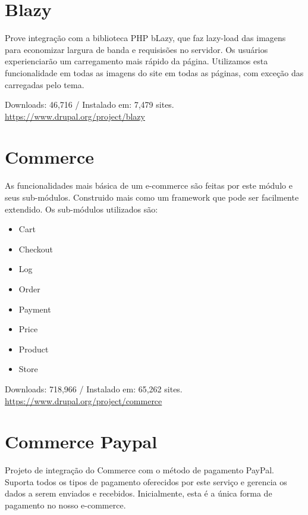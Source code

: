 \section{Blazy}
Prove integração com a biblioteca PHP bLazy, que faz lazy-load das imagens para economizar largura de banda e requisisões no servidor. Os usuários experienciarão um carregamento mais rápido da página. Utilizamos esta funcionalidade em todas as imagens do site em todas as páginas, com exceção das carregadas pelo tema.

\begin{center}
  Downloads: 46,716 / Instalado em: 7,479 sites.
  \url{https://www.drupal.org/project/blazy}
\end{center}

\section{Commerce}
As funcionalidades mais básica de um e-commerce são feitas por este módulo e seus sub-módulos. Construido mais como um framework que pode ser facilmente extendido. Os sub-módulos utilizados são:

\begin{itemize}
  \item Cart
  \item Checkout
  \item Log
  \item Order
  \item Payment
  \item Price
  \item Product
  \item Store
\end{itemize}

\begin{center}
  Downloads: 718,966 / Instalado em: 65,262 sites.
  \url{https://www.drupal.org/project/commerce}
\end{center}

\section{Commerce Paypal}
Projeto de integração do Commerce com o método de pagamento PayPal. Suporta todos os tipos de pagamento oferecidos por este serviço e gerencia os dados a serem enviados e recebidos. Inicialmente, esta é a única forma de pagamento no nosso e-commerce.

